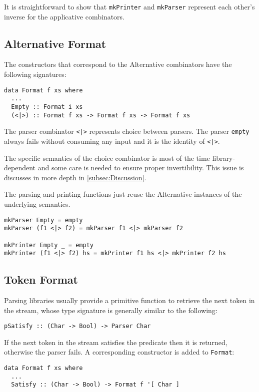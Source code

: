 \documentclass[../Thesis.tex]{subfiles}
\begin{document}
It is straightforward to show that \texttt{mkPrinter} and \texttt{mkParser} represent each other's inverse for the applicative combinators.

\subsection{Alternative Format}
The constructors that correspond to the Alternative combinators 
have the following signatures:

\begin{verbatim}
data Format f xs where
  ...
  Empty :: Format i xs
  (<|>) :: Format f xs -> Format f xs -> Format f xs
\end{verbatim}

The parser combinator \texttt{<|>} represents choice between parsers.
The parser \texttt{empty} always fails without consuming any input and it is 
the identity of \texttt{<|>}.

The specific semantics of the choice combinator is most of the time library-dependent and some care is needed to ensure proper invertibility. 
This issue is discusses in more depth in \ref{subsec:Discussion}.

The parsing and printing functions just reuse the Alternative instances
of the underlying semantics.

\begin{verbatim}
mkParser Empty = empty
mkParser (f1 <|> f2) = mkParser f1 <|> mkParser f2

mkPrinter Empty _ = empty
mkPrinter (f1 <|> f2) hs = mkPrinter f1 hs <|> mkPrinter f2 hs
\end{verbatim}

\subsection{Token Format}
Parsing libraries usually provide a primitive function to retrieve the next token in the stream, whose type signature is generally similar to the following:
\begin{verbatim}
pSatisfy :: (Char -> Bool) -> Parser Char
\end{verbatim}

If the next token in the stream satisfies the predicate then it is returned, otherwise the parser fails.
A corresponding constructor is added to \texttt{Format}:

\begin{verbatim}
data Format f xs where
  ...
  Satisfy :: (Char -> Bool) -> Format f '[ Char ]
\end{verbatim}
\end{document}
